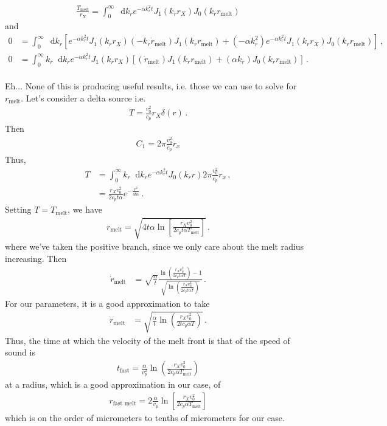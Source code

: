 \documentclass{article}
\newcommand*\diff{\mathop{}\!\mathrm{d}}
\newcommand*\te[1]{\text{#1}}
\newcommand*\p[1]{\left(#1\right)}
\newcommand*\ps[1]{\left[#1\right]}
\newcommand*\f[2]{\frac{#1}{#2}}
\begin{document}
\begin{align}
\f{T_\te{melt}}{r_X} = \int_0^\infty \diff k_r e^{-\alpha k_r^2 t} J_1(k_r r_X) J_0(k_r r_\te{melt})
\end{align}
and
\begin{align}
0&=\int_0^\infty \diff k_r \ps{e^{-\alpha k_r^2 t} J_1(k_r r_X) \p{-k_r\dot r_\te{melt}}J_1(k_r r_\te{melt}) +  \p{-\alpha k_r^2}e^{-\alpha k_r^2 t} J_1(k_r r_X)J_0(k_r r_\te{melt})}\,,\\
0&=\int_0^\infty k_r \diff k_r e^{-\alpha k_r^2 t} J_1(k_r r_X) \ps{\p{\dot r_\te{melt}}J_1(k_r r_\te{melt}) +  \p{\alpha k_r}J_0(k_r r_\te{melt})}\,.
\end{align}
\pagebreak\\
Eh... None of this is producing useful results, i.e. those we can use to solve for $r_\te{melt}$. Let's consider a delta source i.e.
\begin{align}
T = \f{v_0^2}{c_p}r_X\delta(r)\,.
\end{align}
Then
\begin{align}
C_1 =2\pi \f{v_0^2}{c_p}r_x
\end{align}
Thus,
\begin{align}
T &= \int_0^\infty k_r\diff k_r e^{-\alpha k_r^2 t}J_0(k_r r)2\pi \f{v_0^2}{c_p}r_x\,,\\
&=\f{r_X v_0^2}{2 c_p t \alpha} e^{-\f{r^2}{4t\alpha}}\,.
\end{align}
Setting $T = T_\te{melt}$, we have
\begin{align}
r_\te{melt} = \sqrt{4t\alpha\ln\ps{\f{r_X v_0^2}{2 c_p t \alpha T_\te{melt}}}}\,.
\end{align}
where we've taken the positive branch, since we only care about the melt radius increasing. Then
\begin{align}
\dot r_\te{melt} &=\sqrt{\f{\alpha}{t}}\f{\ln\p{\f{r_Xv_0^2}{2 c_p t\alpha T}} - 1}{\sqrt{\ln\p{\f{r_Xv_0^2}{2 c_p t\alpha T}}}}\,.
\end{align}
For our parameters,  it is a good approximation to take
\begin{align}
\dot r_\te{melt} &=\sqrt{\f{\alpha}{t}\ln\p{\f{r_Xv_0^2}{2 t c_p\alpha T}}}\,.
\end{align}
Thus, the time at which the velocity of the melt front is that of the speed of sound is
\begin{align}
t_{\te{fast}} = \f{\alpha}{v_p^2}\ln\p{\f{r_Xv_0^2}{2 c_p\alpha T_\te{melt}}}
\end{align}
at a radius, which is a good approximation in our case, of
\begin{align}
r_\te{fast melt} =  2\f{\alpha}{v_p}\ln\ps{\f{r_X v_0^2}{2 c_p \alpha T_\te{melt}}}
\end{align}
which is on the order of micrometers to tenths of micrometers for our case.
\end{document}
